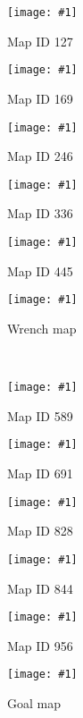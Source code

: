 \def\figw{0.16\columnwidth}%
\newcommand{\formatcaption}[1]{%
\tiny\begin{center}{#1}\end{center}}%
\newcommand{\includesnapshot}[2]{%
  \parbox{\figw}{\texttt{[image: \#1]}\\\vspace{-2.5ex}\formatcaption{#2}}}%
\includesnapshot{./exp-results/training-09x09-0127.png}{Map ID 127} 
\includesnapshot{./exp-results/training-09x09-0169.png}{Map ID 169} 
\includesnapshot{./exp-results/training-09x09-0246.png}{Map ID 246} 
\includesnapshot{./exp-results/training-09x09-0336.png}{Map ID 336} 
\includesnapshot{./exp-results/training-09x09-0445.png}{Map ID 445}
\includesnapshot{./exp-results/planning-09x09-0004.png}{Wrench map}\\
\vspace{1ex}
\includesnapshot{./exp-results/training-09x09-0589.png}{Map ID 589} 
\includesnapshot{./exp-results/training-09x09-0691.png}{Map ID 691} 
\includesnapshot{./exp-results/training-09x09-0828.png}{Map ID 828} 
\includesnapshot{./exp-results/training-09x09-0844.png}{Map ID 844} 
\includesnapshot{./exp-results/training-09x09-0956.png}{Map ID 956}
\includesnapshot{./exp-results/planning-09x09-0006.png}{Goal map}
